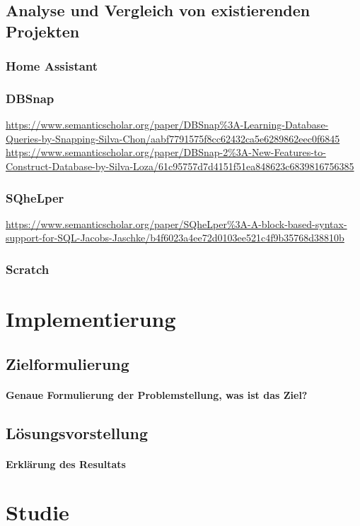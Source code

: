 \documentclass[a4paper, 12pt, oneside, BCOR=1cm,toc=chapterentrywithdots]{scrbook}
\begin{document}
\section{Analyse und Vergleich von existierenden Projekten}
\subsection{Home Assistant}
\subsection{DBSnap}
\url{https://www.semanticscholar.org/paper/DBSnap\%3A-Learning-Database-Queries-by-Snapping-Silva-Chon/aabf7791575f8cc62432ca5e6289862eec0f6845}
\url{https://www.semanticscholar.org/paper/DBSnap-2\%3A-New-Features-to-Construct-Database-by-Silva-Loza/61c95757d7d4151f51ea848623c6839816756385}
\subsection{SQheLper}
\url{https://www.semanticscholar.org/paper/SQheLper\%3A-A-block-based-syntax-support-for-SQL-Jacobs-Jaschke/b4f6023a4ee72d0103ee521c4f9b35768d38810b}
\subsection{Scratch}


\chapter{Implementierung}
\section{Zielformulierung}
\subsubsection{Genaue Formulierung der Problemstellung, was ist das Ziel?}
\section{Lösungsvorstellung}
\subsubsection{Erklärung des Resultats}

\chapter{Studie}
\end{document}

